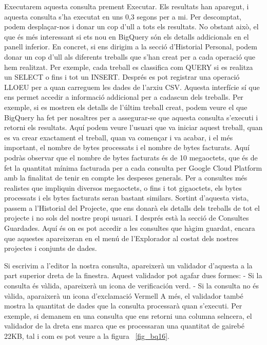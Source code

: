 \documentclass[12pt,longbibliography]{article}
\theoremstyle{definition}
\theoremstyle{remark}
\begin{document}
Executarem aquesta consulta prement Executar. Els resultats han aparegut, i aquesta consulta s'ha executat en uns 0,3 segons per a mi. Per descomptat, podem desplaçar-nos i donar un cop d'ull a tots els resultats. No obstant això, el que és més interessant si ets nou en BigQuery són els detalls addicionals en el panell inferior. En concret, si ens dirigim a la secció d'Historial Personal, podem donar un cop d'ull als diferents treballs que s'han creat per a cada operació que hem realitzat. Per exemple, cada treball es classifica com QUERY si es realitza un SELECT o fins i tot un INSERT. Després es pot registrar una operació LLOEU per a quan carreguem les dades de l'arxiu CSV. Aquesta interfície sí que ens permet accedir a informació addicional per a cadascun dels treballs. Per exemple, si es mostren els detalls de l'últim treball creat, podem veure el que BigQuery ha fet per nosaltres per a assegurar-se que aquesta consulta s'executi i retorni els resultats. Aquí podem veure l'usuari que va iniciar aquest treball, quan es va crear exactament el treball, quan va començar i va acabar, i el més important, el nombre de bytes processats i el nombre de bytes facturats. Aquí podràs observar que el nombre de bytes facturats és de 10 megaoctets, que és de fet la quantitat mínima facturada per a cada consulta per Google Cloud Platform amb la finalitat de tenir en compte les despeses generals. Per a consultes més realistes que impliquin diversos megaoctets, o fins i tot gigaoctets, els bytes processats i els bytes facturats seran bastant similars. Sortint d'aquesta vista, passem a l'Historial del Projecte, que ens donarà els detalls dels treballs de tot el projecte i no sols del nostre propi usuari. I després està la secció de Consultes Guardades. Aquí és on es pot accedir a les consultes que hàgim guardat, encara que aquestes apareixeran en el menú de l'Explorador al costat dels nostres projectes i conjunts de dades.

\vspace{2mm}


Si escrivim a l’editor la nostra consulta, apareixerà un validador d’aquesta a la part superior dreta de la finestra. Aquest validador pot agafar dues formes:
- Si la consulta és vàlida, apareixerà un icona de verificación verd.
- Si la consulta no és vàlida, aparaixerà un icona d’exclamació Vermell
A més, el validador també mostra la quantitat de dades que la consulta processarà quan s’executi. Per exemple, si demanem en una consulta que ens retorni una columna selncera, el validador de la dreta ens marca que es processaran una quantitat de gairebé 22KB, tal i com es pot veure a la figura ~\ref{fig_bq16}.
\end{document}
